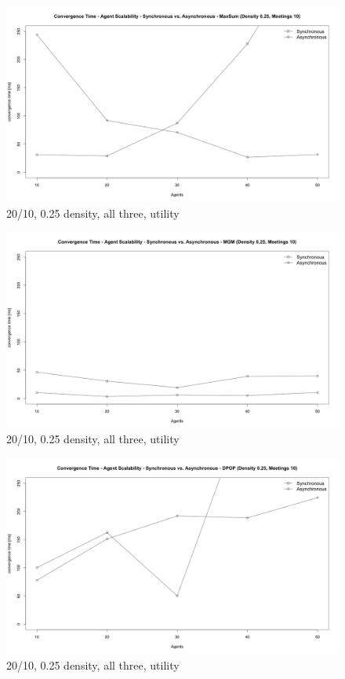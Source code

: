 \begin{figure}[H]
\centering
\includegraphics[width=430px]{graphics/experiments/static/st_14}
\caption{20/10, 0.25 density, all three, utility}
\label{fig:mgm_graph}
\end{figure}

\begin{figure}[H]
\centering
\includegraphics[width=430px]{graphics/experiments/static/st_15}
\caption{20/10, 0.25 density, all three, utility}
\label{fig:mgm_graph}
\end{figure}

\begin{figure}[H]
\centering
\includegraphics[width=430px]{graphics/experiments/static/st_16}
\caption{20/10, 0.25 density, all three, utility}
\label{fig:mgm_graph}
\end{figure}

